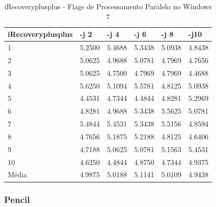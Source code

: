 \begin{table}[!ht]
\centering
\tiny
\caption{iRecoveryplusplus - Flags de Processamento Paralelo no Windows 7}
\label{tab:flag_processamento_paralelo:windows:irecoveryplusplus}
\begin{tabular}{llllll}
\textbf{iRecoveryplusplus} & \textbf{-j 2} & \textbf{-j 4} & \textbf{-j 6} & \textbf{-j 8} & \textbf{-j10}  \\ \toprule
1                          & 5.2500        &  5.4688       &  5.3438       & 5.0938        & 4.8438      \\ 
2                          & 5.0625        &  4.9688       &  5.0781       &  4.7969       &  4.7656     \\ 
3                          & 5.0625        &  4.7500       &  4.7969       &  4.7969       &  4.4688     \\ 
4                          & 5.6250        &  5.1094       &  5.5781       &  4.8125       &  5.0938     \\ 
5                          & 4.4531        &  4.7344       &  4.4844       &  4.8281       &  5.2969     \\ 
6                          & 4.8281        &  4.9688       &  5.3438       &  5.5625       &  5.0781     \\ 
7                          & 5.4844        &  5.4531       &  5.3438       &  5.5156       &  4.8594     \\ 
8                          & 4.7656        &  5.1875       &  5.2188       &  4.8125       &  4.6406     \\ 
9                          & 4.7188        &  5.0625       &  5.0781       &  5.1563       &  5.4531     \\ 
10                         & 4.6250        &  4.4844       &  4.8750       &  4.7344       &  4.9375     \\ \bottomrule
Média                      & 4.9875        &  5.0188       &  5.1141       &  5.0109       &  4.9438     \\ 
\end{tabular}
\end{table}

\clearpage
\subsubsection*{Pencil}

